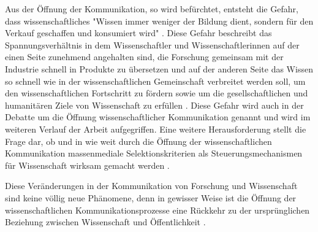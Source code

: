 Aus der Öffnung der Kommunikation, so wird befürchtet, entsteht die Gefahr, dass wissenschaftliches "Wissen immer weniger der Bildung dient, sondern für den Verkauf geschaffen und konsumiert wird" \cite{hagner_2015_sache_buches}. Diese Gefahr beschreibt das Spannungsverhältnis in dem Wissenschaftler und Wissenschaftlerinnen auf der einen Seite zunehmend angehalten sind, die Forschung gemeinsam mit der Industrie schnell in Produkte zu übersetzen und auf der anderen Seite das Wissen so schnell wie in der wissenschaftlichen Gemeinschaft verbreitet werden soll, um den wissenschaftlichen Fortschritt zu fördern sowie um die gesellschaftlichen und humanitären Ziele von Wissenschaft zu erfüllen \cite{harmon_2012_commercialization} \cite{Woelfle_2011}. Diese Gefahr wird auch in der Debatte um die Öffnung wissenschaftlicher Kommunikation genannt \cite{Kansa_2014_open_neoliberalism} \cite{bunz_2013_open} \cite{tkacz_2012_open} \cite{mirowski_2005_contract} und wird im weiteren Verlauf der Arbeit aufgegriffen. Eine weitere Herausforderung stellt die Frage dar, ob und in wie weit durch die Öffnung der wissenschaftlichen Kommunikation massenmediale Selektionskriterien als Steuerungsmechanismen für Wissenschaft wirksam gemacht werden \cite{bbaw_publizieren_2015}.

Diese Veränderungen in der Kommunikation von Forschung und Wissenschaft sind keine völlig neue Phänomene, denn in gewisser Weise ist die Öffnung der wissenschaftlichen Kommunikationsprozesse eine Rückkehr zu der ursprünglichen Beziehung zwischen Wissenschaft und Öffentlichkeit \cite{Konneker_2013} \cite{weingart_2005_wissenschaft}.

